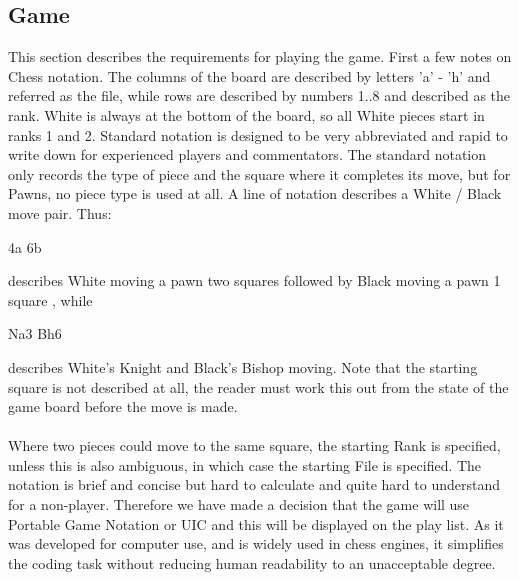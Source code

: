 \documentclass[a4paper,10pt]{article}
\begin{document}
\subsection{Game}

This section describes the requirements for playing the game. First a few notes on Chess notation. 
The columns of the board are described by letters 'a' - 'h' and referred as the file, while rows are described by numbers 1..8 and described as the rank. White is always at the bottom of the board, so all White pieces start in ranks 1 and 2. 
Standard notation is designed to be very abbreviated and rapid to write down for experienced players and commentators. The standard notation only records the type of piece and the square where it completes its move, but for Pawns, no piece type is used at all. A line of notation describes a White / Black move pair. Thus:
\par
4a 6b
\par
describes White moving a pawn two squares followed by Black moving a pawn 1 square , while 
\par
Na3 Bh6
\par
describes White's Knight and Black's Bishop moving. Note that the starting square is not described at all, the reader must work this out from the state of the game board before the move is made. \\
\\
Where two pieces could move to the same square, the starting Rank is specified, unless this is also ambiguous, in which case the starting File is specified. The notation is brief and concise but hard to calculate and quite hard to understand for a non-player. Therefore we have made a decision that the game will use Portable Game Notation \cite{PGN-94} \cite{PGN-Wiki} or UIC \cite{UCIInterface} and this will be displayed on the play list. As it was developed for computer use, and is widely used in chess engines, it simplifies the coding task without reducing human readability to an unacceptable degree. 
\end{document}
